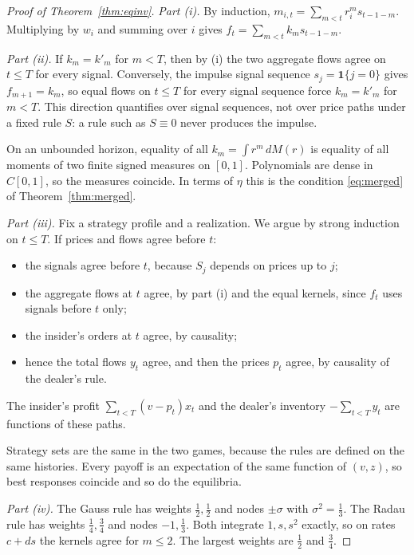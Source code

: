\begin{proof}[Proof of Theorem~\ref{thm:eqinv}]
\emph{Part (i).} By induction, $m_{i,t}=\sum_{m<t}r_i^m s_{t-1-m}$. Multiplying by $w_i$ and summing over $i$ gives $f_t=\sum_{m<t}k_ms_{t-1-m}$.

\emph{Part (ii).} If $k_m=k'_m$ for $m<T$, then by (i) the two aggregate flows agree on $t\le T$ for every signal. Conversely, the impulse signal sequence $s_j=\mathbf 1\{j=0\}$ gives $f_{m+1}=k_m$, so equal flows on $t\le T$ for every signal sequence force $k_m=k'_m$ for $m<T$. This direction quantifies over signal sequences, not over price paths under a fixed rule $S$: a rule such as $S\equiv0$ never produces the impulse.

On an unbounded horizon, equality of all $k_m=\int r^m\,dM(r)$ is equality of all moments of two finite signed measures on $[0,1]$. Polynomials are dense in $C[0,1]$, so the measures coincide. In terms of $\eta$ this is the condition \eqref{eq:merged} of Theorem~\ref{thm:merged}.

\emph{Part (iii).} Fix a strategy profile and a realization. We argue by strong induction on $t\le T$. If prices and flows agree before $t$:
\begin{itemize}[itemsep=1pt,topsep=2pt]
\item the signals agree before $t$, because $S_j$ depends on prices up to $j$;
\item the aggregate flows at $t$ agree, by part (i) and the equal kernels, since $f_t$ uses signals before $t$ only;
\item the insider's orders at $t$ agree, by causality;
\item hence the total flows $y_t$ agree, and then the prices $p_t$ agree, by causality of the dealer's rule.
\end{itemize}
The insider's profit $\sum_{t<T}(v-p_t)x_t$ and the dealer's inventory $-\sum_{t<T}y_t$ are functions of these paths.

Strategy sets are the same in the two games, because the rules are defined on the same histories. Every payoff is an expectation of the same function of $(v,z)$, so best responses coincide and so do the equilibria.

\emph{Part (iv).} The Gauss rule has weights $\tfrac12,\tfrac12$ and nodes $\pm\sigma$ with $\sigma^2=\tfrac13$. The Radau rule has weights $\tfrac14,\tfrac34$ and nodes $-1,\tfrac13$. Both integrate $1,s,s^2$ exactly, so on rates $c+ds$ the kernels agree for $m\le2$. The largest weights are $\tfrac12$ and $\tfrac34$.
\end{proof}

